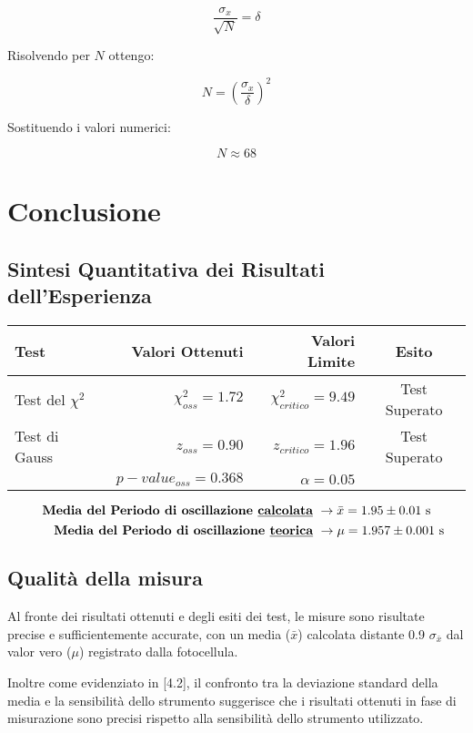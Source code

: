 \documentclass{article}
\begin{document}
\[\frac{\sigma_x}{\sqrt{N}} = \delta\]

\noindent Risolvendo per $N$ ottengo:

\[N = \left( \frac{\sigma_x}{\delta} \right)^2\]

\noindent Sostituendo i valori numerici:

\[N \approx 68 \]

\section{Conclusione}
\subsection{Sintesi Quantitativa dei Risultati dell'Esperienza}

\begin{table}[ht]
	\centering
	\begin{tabular}{|l|r|r|c|}
		\hline
		\textbf{Test} & \textbf{Valori Ottenuti} & \textbf{Valori Limite} & \textbf{Esito}  \\
		\hline
		Test del $\chi^2$ & $\chi^2_{oss} = 1.72$  & $\chi^2_{critico} = 9.49$ &  Test Superato \\
		\hline
		Test di Gauss & $z_{oss} = 0.90$ & $z_{critico} = 1.96$ & Test Superato \\
		& $p-value_{oss} = 0.368$ & $ \alpha = 0.05$ &   \\
		\hline
	\end{tabular}
\end{table}

\[ \text{\textbf{Media del Periodo di oscillazione \underline{calcolata}}  } \rightarrow \bar{x} = 1.95 \pm 0.01\text{ s} \]
\[ \quad\quad \text{\textbf{Media del Periodo di oscillazione \underline{teorica}}    } \rightarrow \mu = 1.957 \pm 0.001 \text{ s} \]

\subsection{Qualità della misura}
Al fronte dei risultati ottenuti e degli esiti dei test, le misure sono risultate precise e sufficientemente accurate, con un media ($\bar{x}$) calcolata distante 0.9 $\sigma_{\bar{x}}$ dal valor vero ($\mu$) registrato dalla fotocellula. 

Inoltre come evidenziato in [4.2], il confronto tra la deviazione standard della media e la sensibilità dello strumento suggerisce che i risultati ottenuti in fase di misurazione sono precisi rispetto alla sensibilità dello strumento utilizzato.
\end{document}
